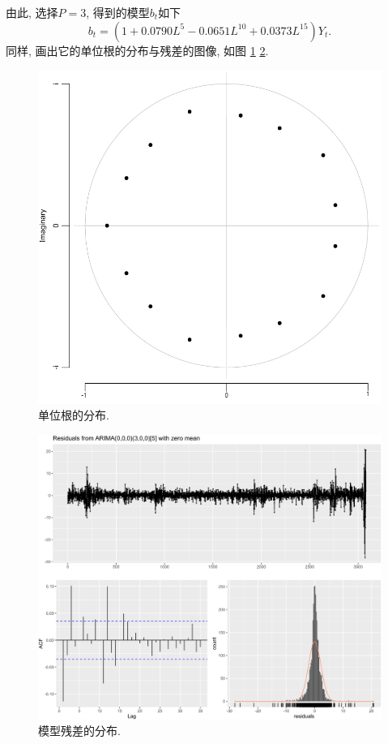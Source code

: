 \documentclass[11pt]{article}
\begin{document}
由此, 选择$P=3$, 得到的模型$b_t$如下
\[
    b_t=(1+0.0790L^5-0.0651L^{10}+0.0373L^{15})Y_t.  
\]
同样, 画出它的单位根的分布与残差的图像, 如图 \ref{fig:8} \ref{fig:9}.
\begin{center}
    \hspace{30pt}\begin{minipage}{0.45\textwidth}
        \begin{figure}
            \centering
            \hspace{-30pt}\includegraphics[width=.9\textwidth]{m2}
            \caption{单位根的分布.\label{fig:8}}
        \end{figure}
    \end{minipage}
    \begin{minipage}{0.45\textwidth}
        \begin{figure}
            \centering
            \hspace{-25pt}\includegraphics[width=.9\textwidth]{m21}
            \caption{模型残差的分布.\label{fig:9}}
        \end{figure}
    \end{minipage}
\end{center}
    
\end{document}
